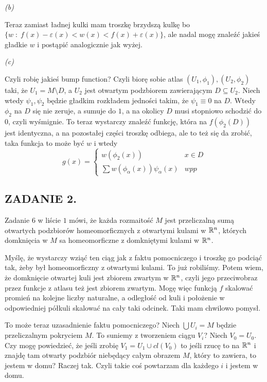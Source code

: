 \documentclass{article}
\begin{document}
\emph{(b)}

Teraz zamiast ładnej kulki mam troszkę brzydszą kulkę bo $\{w\;:\;f(x)-\varepsilon(x)<w(x)<f(x)+\varepsilon(x)\}$, ale nadal mogę znaleźć jakieś gładkie $w$ i postąpić analogicznie jak wyżej.

\emph{(c)}

Czyli robię jakieś bump function?
Czyli biorę sobie atlas $(U_1,\phi_1),(U_2,\phi_2)$ taki, że $U_1=M\setminus D$, a $U_2$ jest otwartym podzbiorem zawierającym $D\subseteq U_2$. Niech wtedy $\psi_1,\psi_2$ będzie gładkim rozkładem jedności takim, że $\psi_1\equiv 0$ na $D$. Wtedy $\phi_2$ na $D$ się nie zeruje, a sumuje do $1$, a na okolicy $D$ musi stopniowo schodzić do $0$, czyli wyśmignie. To teraz wystarczy znaleźć funkcję, która na $f(\phi_2(D))$ jest identyczna, a na pozostałej części troszkę odbiega, ale to też się da zrobić, taka funkcja to może być $w$ i wtedy
$$g(x)=\begin{cases}
    w(\phi_2(x)) & x\in D\\
    \sum w(\phi_\alpha(x))\psi_\alpha(x)&wpp
\end{cases}$$

\subsection*{ZADANIE 2.}

Zadanie $6$ w liście $1$ mówi, że każda rozmaitość $M$ jest przeliczalną sumą otwartych podzbiorów homeomorficznych z otwartymi kulami w $\mathbb{R}^n$, których domknięcia w $M$ sa homeomorficzne z domkniętymi kulami w $\mathbb{R}^n$.

Myślę, że wystarczy wziąć ten ciąg jak z faktu pomocniczego i troszkę go podciąć tak, żeby był homeomorficzny z otwartymi kulami. To już robiliśmy. Potem wiem, że domknięcie otwartej kuli jest zbiorem zwartym w $\mathbb{R}^n$, czyli jego przeciwobraz przez funkcje z atlasu też jest zbiorem zwartym. Mogę więc funkcją $f$ skalować promień na kolejne liczby naturalne, a odległość od kuli i położenie w odpowiedniej półkuli skalować na cały taki odcinek. Taki mam chwilowo pomysł.

To może teraz uzasadnienie faktu pomocniczego?
Niech $\bigcup U_i=M$ będzie przeliczalnym pokryciem $M$.
To suniemy z tworzeniem ciągu $V_i$? Niech $V_0=U_0$. Czy mogę powiedzieć, że jeśli zrobię $V_1=U_1\cup cl(V_0)$ to jeśli rzucę to na $\mathbb{R}^n$ i znajdę tam otwarty podzbiór niebędący całym obrazem $M$, który to zawiera, to jestem w domu? Raczej tak. Czyli takie coś powtarzam dla każdego $i$ i jestem w domu.
\end{document}
